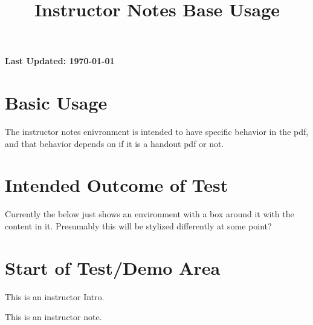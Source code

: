 \documentclass{ximera}
\title{Instructor Notes Base Usage}
\begin{document}
\begin{abstract}
    
\end{abstract}
\maketitle

{{\Huge \bfseries Last Updated: \today}} \\


\section{Basic Usage}
The instructor notes enivronment is intended to have specific behavior in the pdf, and that behavior depends on if it is a handout pdf or not.

\section{Intended Outcome of Test}

Currently the below just shows an environment with a box around it with the content in it. 
Presumably this will be stylized differently at some point?

\section{Start of Test/Demo Area}
\begin{instructorIntro}
This is an instructor Intro.
\end{instructorIntro}


\begin{instructorNotes}
This is an instructor note.
\end{instructorNotes}

\hrulefill
\end{document}
